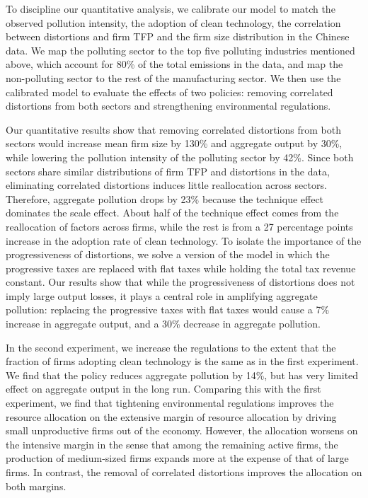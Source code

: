 \documentclass[AEJ]{AEA}
\begin{document}
To discipline our quantitative analysis, we calibrate our model to match the observed pollution intensity, the adoption of clean technology, the correlation between distortions and firm TFP and the firm size distribution in the Chinese data. We map the polluting sector to the top five polluting industries mentioned above, which account for 80\% of the total emissions in the data, and map the non-polluting sector to the rest of the manufacturing sector. We then use the calibrated model to evaluate the effects of two policies: removing correlated distortions from both sectors and strengthening environmental regulations.

Our quantitative results show that removing correlated distortions from both sectors would increase mean firm size by 130\% and aggregate output by 30\%, while lowering the pollution intensity of the polluting sector by 42\%. Since both sectors share similar distributions of firm TFP and distortions in the data, eliminating correlated distortions induces little reallocation across sectors. Therefore, aggregate pollution drops by 23\% because the technique effect dominates the scale effect. About half of the technique effect comes from the reallocation of factors across firms, while the rest is from a 27 percentage points increase in the adoption rate of clean technology. To isolate the importance of the progressiveness of distortions, we solve a version of the model in which the progressive taxes are replaced with flat taxes while holding the total tax revenue constant. Our results show that while the progressiveness of distortions does not imply large output losses, it plays a central role in amplifying aggregate pollution: replacing the progressive taxes with flat taxes would cause a 7\% increase in aggregate output, and a 30\% decrease in aggregate pollution.

In the second experiment, we increase the regulations to the extent that the fraction of firms adopting clean technology is the same as in the first experiment. We find that the policy reduces aggregate pollution by 14\%, but has very limited effect on aggregate output in the long run. Comparing this with the first experiment, we find that tightening environmental regulations improves the resource allocation on the extensive margin of resource allocation by driving small unproductive firms out of the economy. However, the allocation {worsens} on the intensive margin in the sense that among the remaining active firms, the production of medium-sized firms expands more at the expense of that of large firms. In contrast, the removal of correlated distortions improves the allocation on both margins.
\end{document}
